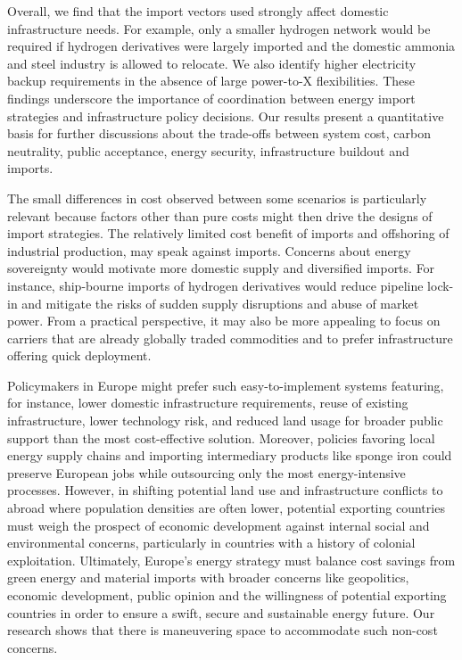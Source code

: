 Overall, we find that the import vectors used strongly affect domestic
infrastructure needs. For example, only a smaller hydrogen network would be
required if hydrogen derivatives were largely imported and the domestic ammonia
and steel industry is allowed to relocate. We also identify higher electricity
backup requirements in the absence of large power-to-X flexibilities. These
findings underscore the importance of coordination between energy import
strategies and infrastructure policy decisions. Our results present a
quantitative basis for further discussions about the trade-offs between system
cost, carbon neutrality, public acceptance, energy security, infrastructure
buildout and imports.

The small differences in cost observed between some scenarios is particularly
relevant because factors other than pure costs might then drive the designs of
import strategies. The relatively limited cost benefit of imports and offshoring
of industrial production, may speak against imports. Concerns about energy
sovereignty would motivate more domestic supply and diversified imports. For
instance, ship-bourne imports of hydrogen derivatives would reduce pipeline
lock-in and mitigate the risks of sudden supply disruptions and abuse of market
power.  From a practical perspective, it may also be more appealing to focus on
carriers that are already globally traded commodities and to prefer
infrastructure offering quick deployment.

Policymakers in Europe might prefer such easy-to-implement systems featuring,
for instance, lower domestic infrastructure requirements, reuse of existing
infrastructure, lower technology risk, and reduced land usage for broader public
support than the most cost-effective solution. Moreover, policies favoring local
energy supply chains and importing intermediary products like sponge iron could
preserve European jobs while outsourcing only the most energy-intensive
processes. However, in shifting potential land use and infrastructure conflicts
to abroad where population densities are often lower, potential exporting
countries must weigh the prospect of economic development against internal
social and environmental concerns, particularly in countries with a history of
colonial exploitation.\cite{tunnGreenHydrogenTransitions2024} Ultimately,
Europe's energy strategy must balance cost savings from green energy and
material imports with broader concerns like geopolitics, economic development,
public opinion and the willingness of potential exporting countries in order to
ensure a swift, secure and sustainable energy future. Our research shows that
there is maneuvering space to accommodate such non-cost concerns.

